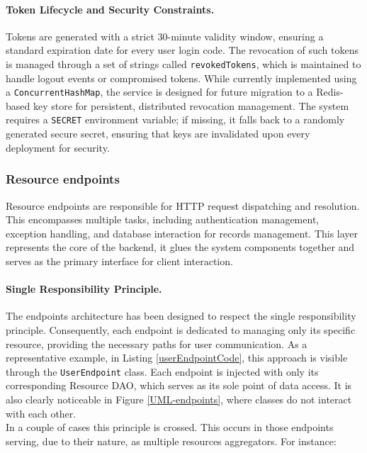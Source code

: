 \paragraph{Token Lifecycle and Security Constraints.} Tokens are generated with a strict 30-minute validity window, ensuring a standard expiration date for every user login code. The revocation of such tokens is managed through a set of strings called \texttt{revokedTokens}, which is maintained to handle logout events or compromised tokens. While currently implemented using a \texttt{ConcurrentHashMap}, the service is designed for future migration to a Redis-based key store for persistent, distributed revocation management. The system requires a \texttt{SECRET} environment variable; if missing, it falls back to a randomly generated secure secret, ensuring that keys are invalidated upon every deployment for security.

\subsubsection{Resource endpoints} 

Resource endpoints are responsible for HTTP request dispatching and resolution. This encompasses multiple tasks, including authentication management, exception handling, and database interaction for records management. This layer represents the core of the backend, it glues the system components together and serves as the primary interface for client interaction.

\paragraph{\textbf{Single Responsibility Principle.}} The endpoints architecture has been designed to respect the single responsibility principle. Consequently, each endpoint is dedicated to managing only its specific resource, providing the necessary paths for user communication. As a representative example, in Listing \ref{userEndpointCode}, this approach is visible through the \texttt{UserEndpoint} class.  Each endpoint is injected with only its corresponding Resource DAO, which serves as its sole point of data access. It is also clearly noticeable in Figure \ref{UML-endpoints}, where classes do not interact with each other. \\

In a couple of cases this principle is crossed. This occurs in those endpoints serving, due to their nature, as multiple resources aggregators. For instance:

